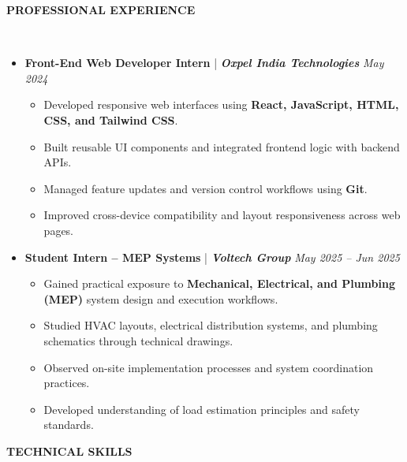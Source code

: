 \documentclass[10pt,a4paper]{article}
\newcommand{\resheading}[1]{{\small \colorbox{mygrey}{\begin{minipage}{0.99\textwidth}{\textbf{#1 \vphantom{p\^{E}}}}\end{minipage}}}}
\begin{document}
\noindent
\resheading{\textbf{PROFESSIONAL EXPERIENCE}}\\[-0.4cm]
\begin{itemize}[noitemsep,nolistsep]

\item \textbf{Front-End Web Developer Intern} | \textbf{\emph{Oxpel India Technologies}} \hfill \emph{May 2024}
\begin{itemize}[noitemsep]
    \item Developed responsive web interfaces using \textbf{React, JavaScript, HTML, CSS, and Tailwind CSS}.
    \item Built reusable UI components and integrated frontend logic with backend APIs.
    \item Managed feature updates and version control workflows using \textbf{Git}.
    \item Improved cross-device compatibility and layout responsiveness across web pages.
\end{itemize}

\item \textbf{Student Intern – MEP Systems} | \textbf{\emph{Voltech Group}} \hfill \emph{May 2025 – Jun 2025}
\begin{itemize}[noitemsep]
    \item Gained practical exposure to \textbf{Mechanical, Electrical, and Plumbing (MEP)} system design and execution workflows.
    \item Studied HVAC layouts, electrical distribution systems, and plumbing schematics through technical drawings.
    \item Observed on-site implementation processes and system coordination practices.
    \item Developed understanding of load estimation principles and safety standards.
\end{itemize}


\end{itemize}
\vspace{3pt}
\noindent
\resheading{\textbf{TECHNICAL SKILLS}}\\[-0.4cm]
\end{document}
